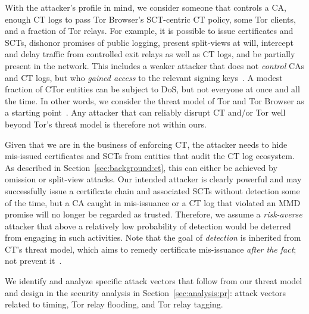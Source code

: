 With
the attacker's profile in mind, we consider someone that controls
	a CA,
	enough CT logs to pass Tor Browser's SCT-centric CT policy, 
	some Tor clients, and
	a fraction of Tor relays.
For example, it is possible to
	issue certificates and SCTs,
	dishonor promises of public logging,
	present split-views at will,
	intercept and delay traffic from controlled exit relays as well as CT logs,
		and
	be partially present in the network.
This includes a weaker attacker that does not \emph{control} CAs and CT logs,
but who \emph{gained access} to the relevant signing keys~\cite{turktrust,%
gdca1-omission}.  A modest fraction of CTor entities can be subject to DoS, but
not everyone at once and all the time.  In other words, we consider the threat
model of Tor and Tor Browser as a starting point~\cite{tor,tor-browser}.  Any
attacker that can reliably disrupt CT and/or Tor well beyond Tor's threat
model is therefore not within ours.

Given that we are in the business of enforcing CT, the attacker needs to hide
mis-issued certificates and SCTs from entities that audit the CT log ecosystem.
As described in Section~\ref{sec:background:ct}, this can either be achieved by
omission or split-view attacks.  Our intended attacker is clearly powerful and
may successfully issue a certificate chain and associated SCTs without detection
some of the time, but a CA caught in mis-issuance or a CT log that violated an
MMD promise will no longer be regarded as trusted.  Therefore, we assume a
\emph{risk-averse} attacker that above a relatively low probability of detection
would be deterred from engaging in such activities. Note that the goal of
\emph{detection} is inherited from CT's threat model, which aims to remedy
certificate mis-issuance \emph{after the fact}; not prevent it~\cite{ct/a}.

We identify and analyze specific attack vectors that follow from our threat
model and design in the security analysis in Section~\ref{sec:analysis:pr}:
attack vectors related to timing, Tor relay flooding, and Tor relay tagging.
